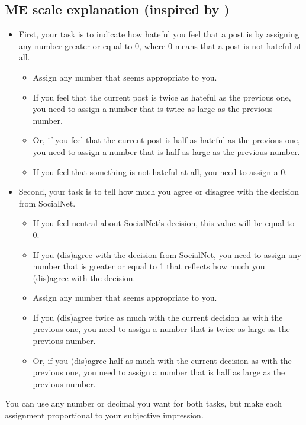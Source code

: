 \documentclass[a4paper]{article}
\begin{document}
\subsection{ME scale explanation (inspired by \cite{moskowitz1977magnitude})}
\begin{itemize}
    \item First, your task is to indicate how hateful you feel that a post is by assigning any number greater or equal to 0, where 0 means that a post is not hateful at all.
          \begin{itemize}
              \item Assign any number that seems appropriate to you.
              \item If you feel that the current post is twice as hateful as the previous one, you need to assign a number that is twice as large as the previous number.
              \item Or, if you feel that the current post is half as hateful as the previous one, you need to assign a number that is half as large as the previous number.
              \item If you feel that something is not hateful at all, you need to assign a 0.
          \end{itemize}
    \item Second, your task is to tell how much you agree or disagree with the decision from SocialNet.
          \begin{itemize}
              \item If you feel neutral about SocialNet’s decision, this value will be equal to 0.
              \item If you (dis)agree with the decision from SocialNet, you need to assign any number that is greater or equal to 1 that reflects how much you (dis)agree with the decision.
              \item Assign any number that seems appropriate to you.
              \item If you (dis)agree twice as much with the current decision as with the previous one, you need to assign a number that is twice as large as the previous number.
              \item Or, if you (dis)agree half as much with the current decision as with the previous one, you need to assign a number that is half as large as the previous number.
          \end{itemize}
\end{itemize}

You can use any number or decimal you want for both tasks, but make each assignment proportional to your subjective impression.
\end{document}
